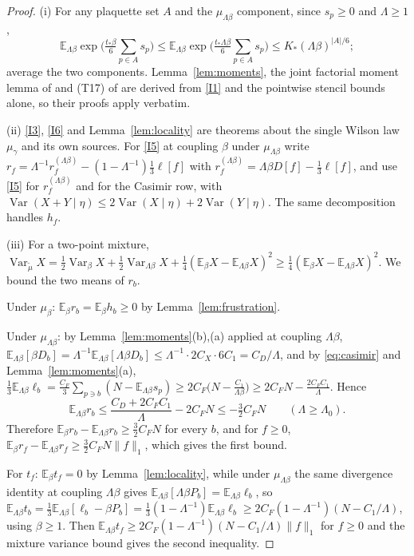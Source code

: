 \documentclass[11pt]{article}
\theoremstyle{definition}
\newcommand{\E}{\mathbb{E}}
\newcommand{\Var}{\operatorname{Var}}
\begin{document}
\begin{proof}
(i) For any plaquette set $A$ and the $\mu_{\Lambda\beta}$ component, since $s_p\ge0$ and $\Lambda\ge1$,
\[
\E_{\Lambda\beta}\exp\Big(\tfrac{t_*\beta}{6}\sum_{p\in A}s_p\Big)\le\E_{\Lambda\beta}\exp\Big(\tfrac{t_*\Lambda\beta}{6}\sum_{p\in A}s_p\Big)
\le K_*(\Lambda\beta)^{|A|/6};
\]
average the two components. Lemma~\ref{lem:moments}, the joint factorial moment lemma of \cite{inn} and
(T17) of \cite{csj} are derived from \ref{I1} and the pointwise stencil bounds alone, so their proofs apply
verbatim.

(ii) \ref{I3}, \ref{I6} and Lemma~\ref{lem:locality} are theorems about the single Wilson law $\mu_\gamma$ and its own
sources. For \ref{I5} at coupling $\beta$ under $\mu_{\Lambda\beta}$ write
$r_f=\Lambda^{-1}r^{(\Lambda\beta)}_f-(1-\Lambda^{-1})\tfrac13\ell[f]$ with $r^{(\Lambda\beta)}_f=\Lambda\beta D[f]-\tfrac13\ell[f]$,
and use \ref{I5} for $r^{(\Lambda\beta)}_f$ and for the Casimir row, with $\Var(X+Y\mid\eta)\le2\Var(X\mid\eta)+2\Var(Y\mid\eta)$.
The same decomposition handles $h_f$.

(iii) For a two-point mixture, $\Var_{\tilde\mu}X=\tfrac12\Var_\beta X+\tfrac12\Var_{\Lambda\beta}X+\tfrac14(\E_\beta X-\E_{\Lambda\beta}X)^2
\ge\tfrac14(\E_\beta X-\E_{\Lambda\beta}X)^2$. We bound the two means of $r_b$.

Under $\mu_\beta$: $\E_\beta r_b=\E_\beta h_b\ge0$ by Lemma~\ref{lem:frustration}.

Under $\mu_{\Lambda\beta}$: by Lemma~\ref{lem:moments}(b),(a) applied at coupling $\Lambda\beta$,
$\E_{\Lambda\beta}[\beta D_b]=\Lambda^{-1}\E_{\Lambda\beta}[\Lambda\beta D_b]\le\Lambda^{-1}\cdot2C_X\cdot6C_1=C_D/\Lambda$,
and by \eqref{eq:casimir} and Lemma~\ref{lem:moments}(a),
$\tfrac13\E_{\Lambda\beta}\ell_b=\tfrac{C_F}{3}\sum_{p\ni b}(N-\E_{\Lambda\beta}s_p)\ge2C_F\big(N-\tfrac{C_1}{\Lambda\beta}\big)
\ge2C_FN-\tfrac{2C_FC_1}{\Lambda}$. Hence
\[
\E_{\Lambda\beta}r_b\le\frac{C_D+2C_FC_1}{\Lambda}-2C_FN\le-\tfrac32C_FN\qquad(\Lambda\ge\Lambda_0).
\]
Therefore $\E_\beta r_b-\E_{\Lambda\beta}r_b\ge\tfrac32C_FN$ for every $b$, and for $f\ge0$,
$\E_\beta r_f-\E_{\Lambda\beta}r_f\ge\tfrac32C_FN\|f\|_1$, which gives the first bound.

For $t_f$: $\E_\beta t_f=0$ by Lemma~\ref{lem:locality}, while under $\mu_{\Lambda\beta}$ the same divergence identity at
coupling $\Lambda\beta$ gives $\E_{\Lambda\beta}[\Lambda\beta P_b]=\E_{\Lambda\beta}\ell_b$, so
$\E_{\Lambda\beta}t_b=\tfrac13\E_{\Lambda\beta}[\ell_b-\beta P_b]=\tfrac13(1-\Lambda^{-1})\E_{\Lambda\beta}\ell_b
\ge2C_F(1-\Lambda^{-1})(N-C_1/\Lambda)$, using $\beta\ge1$. Then $\E_{\Lambda\beta}t_f\ge2C_F(1-\Lambda^{-1})(N-C_1/\Lambda)\|f\|_1$ for
$f\ge0$ and the mixture variance bound gives the second inequality.
\end{proof}
\end{document}
